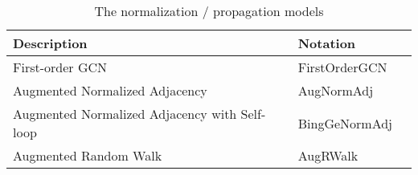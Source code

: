 \documentclass{article}
\begin{document}
\begin{table}[htbp]
  \centering
  \caption{The normalization / propagation models}
      \vspace{-2ex}
    \scriptsize
    \begin{tabular}{l|l|l}
    \hline
    Description & Notation &  \\
    \hline
    First-order GCN & FirstOrderGCN &  \\
    Augmented Normalized Adjacency & AugNormAdj &  \\
    Augmented Normalized Adjacency with Self-loop & BingGeNormAdj &  \\
    Augmented Random Walk & AugRWalk & \\
    \hline
    \end{tabular}\label{tab:normalization}\end{table}
\end{document}
